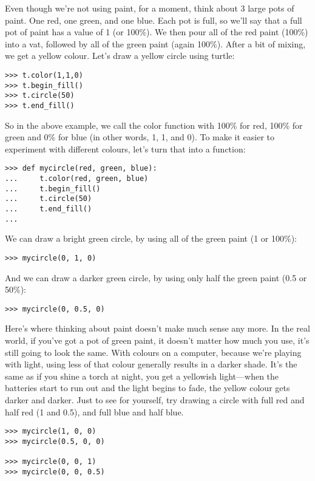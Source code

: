 Even though we're not using paint, for a moment, think about 3 large pots of paint.  One red, one green, and one blue.  Each pot is full, so we'll say that a full pot of paint has a value of 1 (or 100\%).  We then pour all of the red paint (100\%) into a vat, followed by all of the green paint (again 100\%).  After a bit of mixing, we get a yellow colour.  Let's draw a yellow circle using turtle:

\begin{Verbatim}[frame=single]
>>> t.color(1,1,0)
>>> t.begin_fill()
>>> t.circle(50)
>>> t.end_fill()
\end{Verbatim}

So in the above example, we call the color function with 100\% for red, 100\% for green and 0\% for blue (in other words, 1, 1, and 0).  To make it easier to experiment with different colours, let's turn that into a function:

\begin{Verbatim}[frame=single]
>>> def mycircle(red, green, blue):
...     t.color(red, green, blue)
...     t.begin_fill()
...     t.circle(50)
...     t.end_fill()
...
\end{Verbatim}

\noindent
We can draw a bright green circle, by using all of the green paint (1 or 100\%):

\begin{Verbatim}[frame=single]
>>> mycircle(0, 1, 0)
\end{Verbatim}

\noindent
And we can draw a darker green circle, by using only half the green paint (0.5 or 50\%):

\begin{Verbatim}[frame=single]
>>> mycircle(0, 0.5, 0)
\end{Verbatim}

Here's where thinking about paint doesn't make much sense any more.  In the real world, if you've got a pot of green paint, it doesn't matter how much you use, it's still going to look the same.  With colours on a computer, because we're playing with light, using less of that colour generally results in a darker shade.  It's the same as if you shine a torch at night, you get a yellowish light---when the batteries start to run out and the light begins to fade, the yellow colour gets darker and darker.  Just to see for yourself, try drawing a circle with full red and half red (1 and 0.5), and full blue and half blue.

\begin{Verbatim}[frame=single]
>>> mycircle(1, 0, 0)
>>> mycircle(0.5, 0, 0)

>>> mycircle(0, 0, 1)
>>> mycircle(0, 0, 0.5)
\end{Verbatim}

